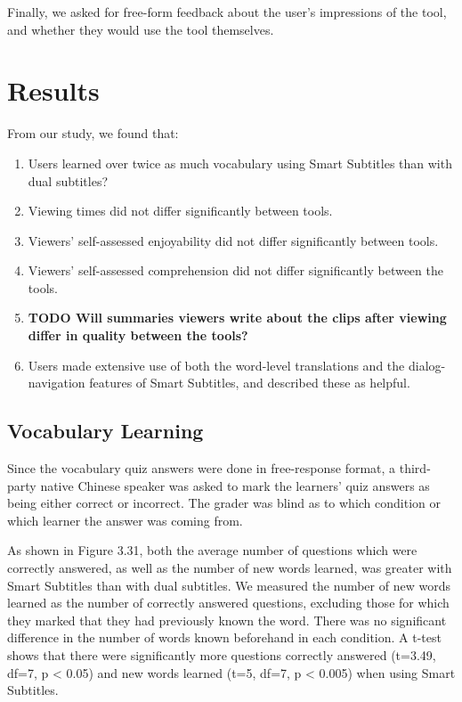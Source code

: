 \documentclass{sigchi}
\begin{document}
Finally, we asked for free-form feedback about the user's impressions of the tool, and whether they would use the tool themselves.

\section{Results}

From our study, we found that:

\begin{enumerate}[noitemsep]
\item Users learned over twice as much vocabulary using Smart Subtitles than with dual subtitles?
\item Viewing times did not differ significantly between tools.
\item Viewers' self-assessed enjoyability did not differ significantly between tools.
\item Viewers' self-assessed comprehension did not differ significantly between the tools.
\item \textbf{TODO Will summaries viewers write about the clips after viewing differ in quality between the tools?}
\item Users made extensive use of both the word-level translations and the dialog-navigation features of Smart Subtitles, and described these as helpful.
\end{enumerate}

\subsection{Vocabulary Learning}

Since the vocabulary quiz answers were done in free-response format, a third-party native Chinese speaker was asked to mark the learners' quiz answers as being either correct or incorrect. The grader was blind as to which condition or which learner the answer was coming from.

As shown in Figure 3.31, both the average number of questions which were correctly answered, as well as the number of new words learned, was greater with Smart Subtitles than with dual subtitles. We measured the number of new words learned as the number of correctly answered questions, excluding those for which they marked that they had previously known the word. There was no significant difference in the number of words known beforehand in each condition. A t-test shows that there were significantly more questions correctly answered (t=3.49, df=7, p < 0.05) and new words learned (t=5, df=7, p < 0.005) when using Smart Subtitles.
\end{document}
